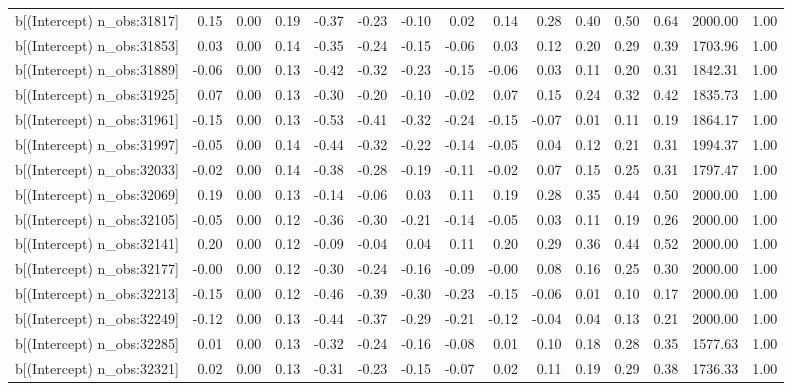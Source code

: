 \begin{table}[ht]
\begin{tabular}{rrrrrrrrrrrrrrr}
  b[(Intercept) n\_obs:31817] & 0.15 & 0.00 & 0.19 & -0.37 & -0.23 & -0.10 & 0.02 & 0.14 & 0.28 & 0.40 & 0.50 & 0.64 & 2000.00 & 1.00 \\ 
  b[(Intercept) n\_obs:31853] & 0.03 & 0.00 & 0.14 & -0.35 & -0.24 & -0.15 & -0.06 & 0.03 & 0.12 & 0.20 & 0.29 & 0.39 & 1703.96 & 1.00 \\ 
  b[(Intercept) n\_obs:31889] & -0.06 & 0.00 & 0.13 & -0.42 & -0.32 & -0.23 & -0.15 & -0.06 & 0.03 & 0.11 & 0.20 & 0.31 & 1842.31 & 1.00 \\ 
  b[(Intercept) n\_obs:31925] & 0.07 & 0.00 & 0.13 & -0.30 & -0.20 & -0.10 & -0.02 & 0.07 & 0.15 & 0.24 & 0.32 & 0.42 & 1835.73 & 1.00 \\ 
  b[(Intercept) n\_obs:31961] & -0.15 & 0.00 & 0.13 & -0.53 & -0.41 & -0.32 & -0.24 & -0.15 & -0.07 & 0.01 & 0.11 & 0.19 & 1864.17 & 1.00 \\ 
  b[(Intercept) n\_obs:31997] & -0.05 & 0.00 & 0.14 & -0.44 & -0.32 & -0.22 & -0.14 & -0.05 & 0.04 & 0.12 & 0.21 & 0.31 & 1994.37 & 1.00 \\ 
  b[(Intercept) n\_obs:32033] & -0.02 & 0.00 & 0.14 & -0.38 & -0.28 & -0.19 & -0.11 & -0.02 & 0.07 & 0.15 & 0.25 & 0.31 & 1797.47 & 1.00 \\ 
  b[(Intercept) n\_obs:32069] & 0.19 & 0.00 & 0.13 & -0.14 & -0.06 & 0.03 & 0.11 & 0.19 & 0.28 & 0.35 & 0.44 & 0.50 & 2000.00 & 1.00 \\ 
  b[(Intercept) n\_obs:32105] & -0.05 & 0.00 & 0.12 & -0.36 & -0.30 & -0.21 & -0.14 & -0.05 & 0.03 & 0.11 & 0.19 & 0.26 & 2000.00 & 1.00 \\ 
  b[(Intercept) n\_obs:32141] & 0.20 & 0.00 & 0.12 & -0.09 & -0.04 & 0.04 & 0.11 & 0.20 & 0.29 & 0.36 & 0.44 & 0.52 & 2000.00 & 1.00 \\ 
  b[(Intercept) n\_obs:32177] & -0.00 & 0.00 & 0.12 & -0.30 & -0.24 & -0.16 & -0.09 & -0.00 & 0.08 & 0.16 & 0.25 & 0.30 & 2000.00 & 1.00 \\ 
  b[(Intercept) n\_obs:32213] & -0.15 & 0.00 & 0.12 & -0.46 & -0.39 & -0.30 & -0.23 & -0.15 & -0.06 & 0.01 & 0.10 & 0.17 & 2000.00 & 1.00 \\ 
  b[(Intercept) n\_obs:32249] & -0.12 & 0.00 & 0.13 & -0.44 & -0.37 & -0.29 & -0.21 & -0.12 & -0.04 & 0.04 & 0.13 & 0.21 & 2000.00 & 1.00 \\ 
  b[(Intercept) n\_obs:32285] & 0.01 & 0.00 & 0.13 & -0.32 & -0.24 & -0.16 & -0.08 & 0.01 & 0.10 & 0.18 & 0.28 & 0.35 & 1577.63 & 1.00 \\ 
  b[(Intercept) n\_obs:32321] & 0.02 & 0.00 & 0.13 & -0.31 & -0.23 & -0.15 & -0.07 & 0.02 & 0.11 & 0.19 & 0.29 & 0.38 & 1736.33 & 1.00 \\ 

\end{tabular}
\end{table}
